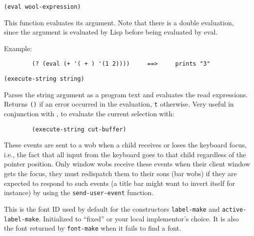         
{\usagefont\begin{verbatim}
(eval wool-expression)
\end{verbatim}}\usageupspace

This function evaluates its argument. Note that there is a double evaluation,
since the argument is evaluated by Lisp before being evaluated by eval.

Example:{\exemplefont\upspace\begin{verbatim}
        (? (eval (+ '( + ) '(1 2))))     ==>     prints "3"
\end{verbatim}}

        
{\usagefont\begin{verbatim}
(execute-string string)
\end{verbatim}}\usageupspace

Parses the string argument as a {\WOOL} program text and evaluates the read
expressions. Returns \verb"()" if an error occurred in the evaluation,
\verb"t" otherwise. Very useful in conjunction with ,
to evaluate the current selection with:

{\exemplefont\begin{verbatim}
        (execute-string cut-buffer)
\end{verbatim}}

        

These events are sent to a wob when a child receives or loses the keyboard
focus, i.e., the fact that all input from the keyboard goes to that child
regardless of the pointer position. Only window wobs receive these events
when their client window gets the focus,
they must redispatch them to their sons (bar wobs) if they are expected to
respond to such events (a title bar might want to invert itself for instance)
by using the \verb"send-user-event" function.

        

This is the font ID used by default for the
constructors \verb"label-make" and \verb"active-label-make". Initialized to
``fixed'' or your local implementor's choice.
It is also the font returned by \verb"font-make" when it fails to find a font.

